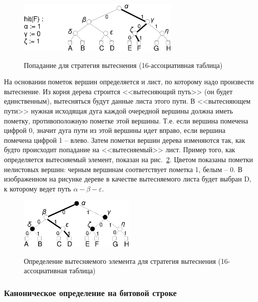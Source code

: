 \begin{figure}[h] \center
  \includegraphics[width=0.7\textwidth]{2.theor/plruhit}\\
  \caption{Попадание для стратегия вытеснения \PseudoLRU
  (16-ассоциативная таблица)}\label{pseudo_lru_hit}
\end{figure}

На основании пометок вершин определяется и лист, по которому надо произвести
вытеснение.
Из корня дерева строится <<вытесняющий путь>> (он будет единственным),
вытесняться будут данные листа этого пути. В <<вытесняющем пути>> нужная
исходящая дуга каждой очередной вершины должна иметь пометку, противоположную
пометке этой вершины. Т.е. если вершина помечена цифрой 0, значит дуга пути из
этой вершины идет вправо, если вершина помечена цифрой 1 -- влево. Затем пометки
вершин дерева изменяются так, как будто происходит попадание на <<вытесняемый>>
лист. Пример того, как определяется вытесняемый элемент, показан на
рис.~\ref{pseudo_lru_miss}. Цветом показаны пометки нелистовых вершин: черным
вершинам соответствует пометка 1, белым
-- 0. В изображенном на рисунке дереве в качестве вытесняемого листа будет
выбран D, к которому ведет путь $\alpha-\beta-\varepsilon$.

\begin{figure}[h] \center
  \includegraphics[width=0.5\textwidth]{2.theor/plrumiss}\\
  \caption{Определение вытесняемого элемента для стратегия вытеснения
  \PseudoLRU (16-ассоциативная таблица)}\label{pseudo_lru_miss}
\end{figure}


\subsubsection{Каноническое определение \PseudoLRU на битовой строке}

